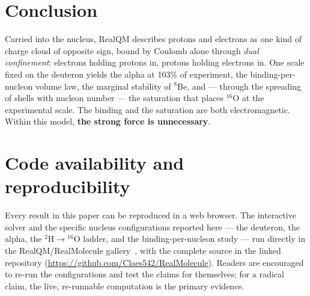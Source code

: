 \documentclass[11pt]{article}
\begin{document}
\section{Conclusion}

Carried into the nucleus, RealQM describes protons and electrons as one kind of charge cloud of
opposite sign, bound by Coulomb alone through \emph{dual confinement}: electrons holding protons
in, protons holding electrons in. One scale fixed on the deuteron yields the alpha at 103\% of
experiment, the binding-per-nucleon volume law, the marginal stability of $^8$Be, and ---
through the spreading of shells with nucleon number --- the saturation that places $^{16}$O at
the experimental scale.
The binding and the saturation are both electromagnetic. Within this model, \textbf{the strong
force is unnecessary}.

\section*{Code availability and reproducibility}

Every result in this paper can be reproduced in a web browser. The interactive solver and the
specific nucleus configurations reported here --- the deuteron, the alpha, the
$^2\mathrm{H}\!\to\!{}^{16}\mathrm{O}$ ladder, and the binding-per-nucleon study --- run directly
in the RealQM/RealMolecule gallery~\cite{Gallery}, with the complete source in the linked
repository (\url{https://github.com/Claes542/RealMolecule}). Readers are encouraged to re-run the
configurations and test the claims for themselves; for a radical claim, the live, re-runnable
computation is the primary evidence.
\end{document}

